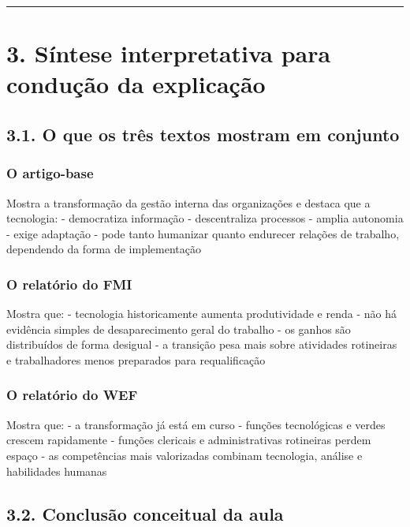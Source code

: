 \documentclass[
]{book}
\theoremstyle{definition}
\theoremstyle{definition}
\theoremstyle{definition}
\theoremstyle{definition}
\theoremstyle{remark}
\begin{document}
\begin{center}\rule{0.5\linewidth}{0.5pt}\end{center}

\chapter{3. Síntese interpretativa para condução da explicação}\label{suxedntese-interpretativa-para-conduuxe7uxe3o-da-explicauxe7uxe3o}

\section{3.1. O que os três textos mostram em conjunto}\label{o-que-os-truxeas-textos-mostram-em-conjunto}

\subsection{O artigo-base}\label{o-artigo-base}

Mostra a transformação da gestão interna das organizações e destaca que a tecnologia:
- democratiza informação
- descentraliza processos
- amplia autonomia
- exige adaptação
- pode tanto humanizar quanto endurecer relações de trabalho, dependendo da forma de implementação

\subsection{O relatório do FMI}\label{o-relatuxf3rio-do-fmi}

Mostra que:
- tecnologia historicamente aumenta produtividade e renda
- não há evidência simples de desaparecimento geral do trabalho
- os ganhos são distribuídos de forma desigual
- a transição pesa mais sobre atividades rotineiras e trabalhadores menos preparados para requalificação

\subsection{O relatório do WEF}\label{o-relatuxf3rio-do-wef}

Mostra que:
- a transformação já está em curso
- funções tecnológicas e verdes crescem rapidamente
- funções clericais e administrativas rotineiras perdem espaço
- as competências mais valorizadas combinam tecnologia, análise e habilidades humanas

\section{3.2. Conclusão conceitual da aula}\label{conclusuxe3o-conceitual-da-aula}
\end{document}
